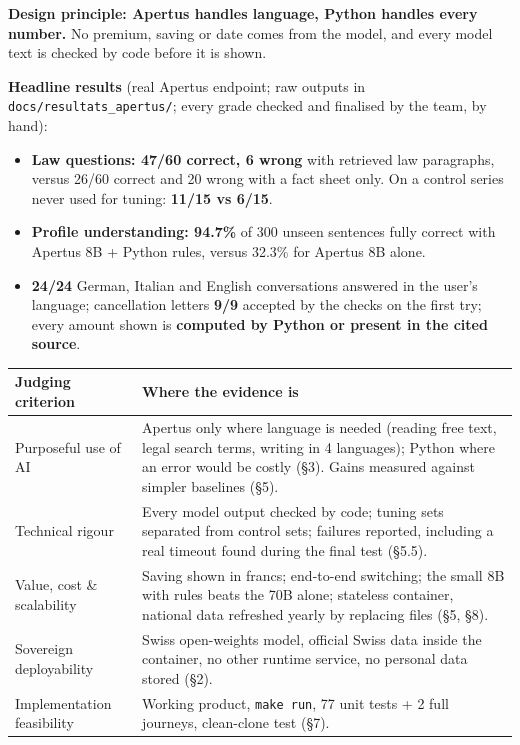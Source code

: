 \documentclass[10pt,a4paper]{article}
\newcommand{\entete}[1]{\textsf{\bfseries\footnotesize #1}}
\newcommand{\gras}[1]{\textbf{#1}}
\begin{document}
\gras{Design principle: Apertus handles language, Python handles every number.} No premium, saving or date comes
from the model, and every model text is checked by code before it is shown.

\begin{encadre}
\gras{Headline results} (real Apertus endpoint; raw outputs in \texttt{docs/resultats\_apertus/}; every grade
checked and finalised by the team, by hand):
\begin{itemize}
\item \gras{Law questions: 47/60 correct, 6 wrong} with retrieved law paragraphs, versus 26/60 correct and 20 wrong
      with a fact sheet only. On a control series never used for tuning: \gras{11/15 vs 6/15}.
\item \gras{Profile understanding: 94.7\%} of 300 unseen sentences fully correct with Apertus 8B + Python rules,
      versus 32.3\% for Apertus 8B alone.
\item \gras{24/24} German, Italian and English conversations answered in the user's language; cancellation letters
      \gras{9/9} accepted by the checks on the first try; every amount shown is \gras{computed by Python or present in
      the cited source}.
\end{itemize}
\end{encadre}

\begin{tabularx}{\textwidth}{@{}>{\raggedright\arraybackslash}p{3.6cm}Y@{}}
\toprule
\entete{Judging criterion} & \entete{Where the evidence is} \\
\midrule
Purposeful use of AI & Apertus only where language is needed (reading free text, legal search terms, writing in 4
languages); Python where an error would be costly (§3). Gains measured against simpler baselines (§5). \\
Technical rigour & Every model output checked by code; tuning sets separated from control sets; failures
reported, including a real timeout found during the final test (§5.5). \\
Value, cost \& scalability & Saving shown in francs; end-to-end switching; the small 8B with rules beats the 70B alone;
stateless container, national data refreshed yearly by replacing files (§5, §8). \\
Sovereign deployability & Swiss open-weights model, official Swiss data inside the container, no other runtime
service, no personal data stored (§2). \\
Implementation feasibility & Working product, \texttt{make run}, 77 unit tests + 2 full journeys, clean-clone test (§7). \\
\bottomrule
\end{tabularx}
\end{document}
